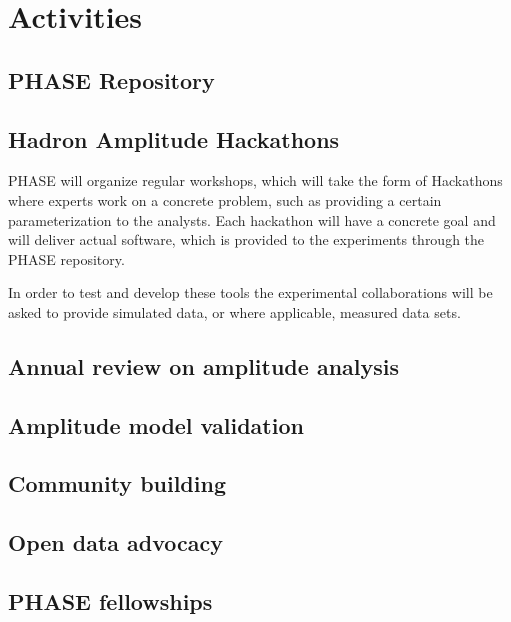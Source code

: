 \section{Activities}
\label{sec:activities}
\subsection{PHASE Repository}

\subsection{Hadron Amplitude Hackathons}
PHASE will organize regular workshops, which will take the form of Hackathons where experts work on a concrete problem, such as providing a certain parameterization to the analysts. Each hackathon will have a concrete goal and will deliver actual software, which is provided to the experiments through the PHASE repository.

In order to test and develop these tools the experimental collaborations will be asked to provide simulated data, or where applicable, measured data sets. 

\subsection{Annual review on amplitude analysis}

\subsection{Amplitude model validation}

\subsection{Community building}

\subsection{Open data advocacy}

\subsection{PHASE fellowships}